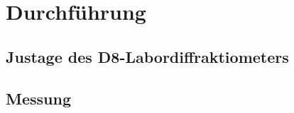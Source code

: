 \section{Durchführung}
\label{sec:Durchführung}

\subsection{Justage des D8-Labordiffraktiometers}
\label{subsec:justage}





















\subsection{Messung}
\label{subsec:messung}



